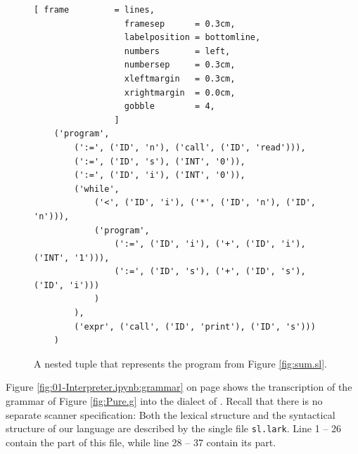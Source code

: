 \begin{figure}[!ht]
\centering
\begin{Verbatim}[ frame         = lines,
                  framesep      = 0.3cm,
                  labelposition = bottomline,
                  numbers       = left,
                  numbersep     = 0.3cm,
                  xleftmargin   = 0.3cm,
                  xrightmargin  = 0.0cm,
                  gobble        = 4,
                ]
    ('program',
        (':=', ('ID', 'n'), ('call', ('ID', 'read'))),
        (':=', ('ID', 's'), ('INT', '0')),
        (':=', ('ID', 'i'), ('INT', '0')),
        ('while',
            ('<', ('ID', 'i'), ('*', ('ID', 'n'), ('ID', 'n'))),
            ('program',
                (':=', ('ID', 'i'), ('+', ('ID', 'i'), ('INT', '1'))),
                (':=', ('ID', 's'), ('+', ('ID', 's'), ('ID', 'i')))
            )
        ),
        ('expr', ('call', ('ID', 'print'), ('ID', 's')))
    )
\end{Verbatim}
\vspace*{-0.3cm}
\caption{A nested tuple that represents the program from Figure \ref{fig:sum.sl}.}
\label{fig:sum.ast}
\end{figure}
\FloatBarrier

\noindent
Figure \ref{fig:01-Interpreter.ipynb:grammar} on page \pageref{fig:01-Interpreter.ipynb:grammar} shows the
transcription of the grammar of Figure \ref{fig:Pure.g} into the  dialect of
.  Recall that there is no separate scanner specification:  Both the lexical structure and
the syntactical structure of our language are described by the single file \texttt{sl.lark}.  Line 1 -- 26
contain the  part of this file, while line 28 -- 37 contain its  part.

